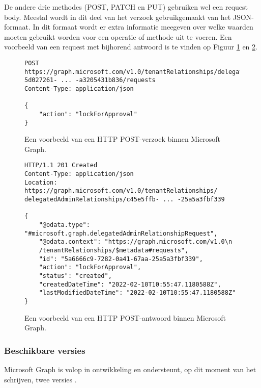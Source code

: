 De andere drie methodes (POST, PATCH en PUT) gebruiken wel een request body. Meestal wordt in dit deel van het verzoek gebruikgemaakt van het \ac{JSON}-formaat. In dit formaat wordt er extra informatie meegeven over welke waarden moeten gebruikt worden voor een operatie of methode uit te voeren. Een voorbeeld van een request met bijhorend antwoord is te vinden op Figuur \ref{MSPR} en \ref{MSPRES}. \\

\begin{figure}[h]
    \footnotesize\begin{verbatim}POST
https://graph.microsoft.com/v1.0/tenantRelationships/delegatedAdminRelationships/
5d027261- ... -a3205431b836/requests
Content-Type: application/json

{
    "action": "lockForApproval"
}
    \end{verbatim}    
    \caption[Voorbeeld Microsoft Graph POST-verzoek]{Een voorbeeld van een \ac{HTTP} POST-verzoek binnen Microsoft Graph.}
    \label{MSPR}
\end{figure}

\begin{figure}[h]
    \footnotesize\begin{verbatim}
HTTP/1.1 201 Created
Content-Type: application/json
Location: https://graph.microsoft.com/v1.0/tenantRelationships/
delegatedAdminRelationships/c45e5ffb- ... -25a5a3fbf339

{
    "@odata.type": "#microsoft.graph.delegatedAdminRelationshipRequest",
    "@odata.context": "https://graph.microsoft.com/v1.0\n
    /tenantRelationships/$metadata#requests",
    "id": "5a6666c9-7282-0a41-67aa-25a5a3fbf339",
    "action": "lockForApproval",
    "status": "created",
    "createdDateTime": "2022-02-10T10:55:47.1180588Z",
    "lastModifiedDateTime": "2022-02-10T10:55:47.1180588Z"
}
    \end{verbatim}    
    \caption[Voorbeeld Microsoft Graph POST-antwoord]{Een voorbeeld van een \ac{HTTP} POST-antwoord binnen Microsoft Graph.}
    \label{MSPRES}
\end{figure}

\subsubsection{Beschikbare versies}

Microsoft Graph is volop in ontwikkeling en ondersteunt, op dit moment van het schrijven, twee versies \Autocite{Microsoft2023f}. \\

